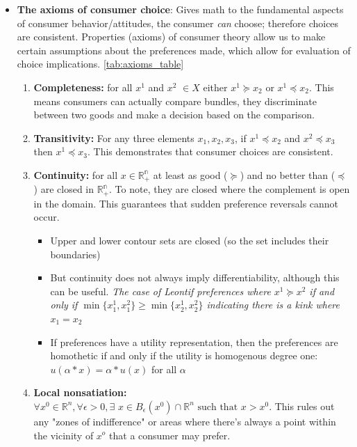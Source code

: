 \documentclass{article}
\begin{document}
\begin{itemize}
    \item \textbf{The axioms of consumer choice}: Gives math to the fundamental aspects of consumer behavior/attitudes, the consumer \textit{can} choose; therefore choices are consistent. Properties (axioms) of consumer theory allow us to make certain assumptions about the preferences made, which allow for evaluation of choice implications. \ref{tab:axioms_table}
    \begin{enumerate}
        \item \textbf{Completeness:} for all $x^{1}$ and $x^{2}$ $\in X$ either $x^{1} \succeq x_{2}$ or $x^{1} \preceq x_{2}$. This means consumers can actually compare bundles, they discriminate between two goods and make a decision based on the comparison. 
        \item \textbf{Transitivity:} For any three elements $x_{1}, x_{2}, x_{3}$, if $x^{1} \preceq x_{2}$ and $x^{2} \preceq x_{3}$ then $x^{1} \preceq x_{3}$. This demonstrates that consumer choices are consistent. 
        \item \textbf{Continuity:} for all $x \in \mathbb{R^{n}_{+}}$ at least as good ($\succeq$) and no better than ($\preceq$) are closed in $\mathbb{R^{n}_{+}}$. To note, they are closed where the complement is open in the domain. This guarantees that sudden preference reversals cannot occur. 
        \begin{itemize}
            \item Upper and lower contour sets are closed (so the set includes their boundaries)
            \item But continuity does not always imply differentiability, although this can be useful. \textit{The case of Leontif preferences where $x^1 \succeq x^2$ if and only if $\min \{ x^1_1, x^2_1 \} \geq \min \{ x^1_2, x^2_2 \}$ indicating there is a kink where $x_1=x_2$}
            \item If preferences have a utility representation, then the preferences are homothetic if and only if the utility is homogenous degree one: $u(\alpha*x) = \alpha*u(x)$ for all $\alpha$
        \end{itemize}
        \item \textbf{Local nonsatiation:} $\forall x^0 \in \mathbb{R}^n, \forall \epsilon > 0, \exists \textit{ x} \in B_\epsilon(x^0) \cap \mathbb{R}^n \text{ such that } x > x^0$. This rules out any "zones of indifference" or areas where there's always a point within the vicinity of $x^o$ that a consumer may prefer. 

\end{enumerate}
\end{itemize}
\end{document}
